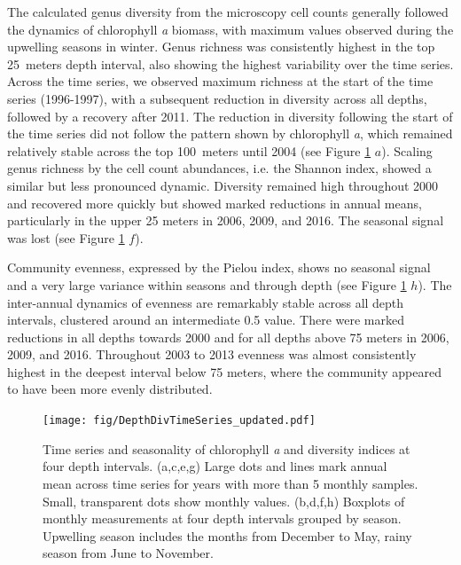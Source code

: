 \documentclass[draft]{agujournal2019}
\begin{document}
    The calculated genus diversity from the microscopy cell counts generally followed the dynamics of chlorophyll \textit{a} biomass, with maximum values observed during the upwelling seasons in winter. Genus richness was consistently highest in the top \qty{25}{meters} depth interval, also showing the highest variability over the time series. Across the time series, we observed maximum richness at the start of the time series (1996-1997), with a subsequent reduction in diversity across all depths, followed by a recovery after 2011. The reduction in diversity following the start of the time series did not follow the pattern shown by chlorophyll \textit{a}, which remained relatively stable across the top \qty{100}{meters} until 2004 (see Figure \ref{fig:divts} $a$). Scaling genus richness by the cell count abundances, i.e. the Shannon index, showed a similar but less pronounced dynamic. Diversity remained high throughout 2000 and recovered more quickly but showed marked reductions in annual means, particularly in the upper 25 meters in 2006, 2009, and 2016. The seasonal signal was lost (see Figure \ref{fig:divts} $f$). 
    
    Community evenness, expressed by the Pielou index, shows no seasonal signal and a very large variance within seasons and through depth (see Figure \ref{fig:divts} $h$). The inter-annual dynamics of evenness are remarkably stable across all depth intervals, clustered around an intermediate 0.5 value. There were marked reductions in all depths towards 2000 and for all depths above 75 meters in 2006, 2009, and 2016. Throughout 2003 to 2013 evenness was almost consistently highest in the deepest interval below 75 meters, where the community appeared to have been more evenly distributed. 
    
    \begin{figure}
    \begin{center}
    \noindent\texttt{[image: fig/DepthDivTimeSeries\_updated.pdf]}
    \end{center}
    \caption{Time series and seasonality of chlorophyll \textit{a} and diversity indices at four depth intervals. (a,c,e,g) Large dots and lines mark annual mean across time series for years with more than 5 monthly samples. Small, transparent dots show monthly values. (b,d,f,h) Boxplots of monthly measurements at four depth intervals grouped by season. Upwelling season includes the months from December to May, rainy season from June to November.}
    \label{fig:divts}
    \end{figure}
\end{document}
